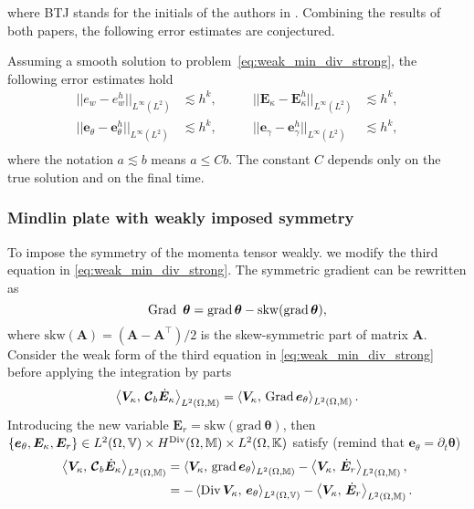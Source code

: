 where BTJ stands for the initials of the authors in \cite{becache2000wave,becache2001elas}. Combining the results of both papers, the following error estimates are conjectured.
\begin{conjecture}\label{conj:BJTestimates}
	Assuming a smooth solution to problem~\eqref{eq:weak_min_div_strong}, the following error estimates hold 
	\begin{equation}
	\label{eq:errBEC}
	\begin{aligned}
	||e_w - e_w^h||_{L^{\infty}(L^2)} &\lesssim h^{k}, \\
	||\bm{e}_\theta - \bm{e}_\theta^h||_{L^{\infty}(L^2)} &\lesssim h^{k}, \\
	\end{aligned} \qquad
	\begin{aligned}
	||\bm{E}_\kappa - \bm{E}_\kappa^h||_{L^{\infty}(L^2)} &\lesssim  h^{k}, \\
	||\bm{e}_\gamma - \bm{e}_\gamma^ h||_{L^{\infty}(L^2)} &\lesssim  h^{k}, \\
	\end{aligned} 
	\end{equation}
	where the notation $a \lesssim  b$ means $a \le C b$. The constant $C$ depends only on the true solution and on the final time.
\end{conjecture}


\subsubsection{Mindlin plate with weakly imposed symmetry}\label{sec:min_weak}
To impose the symmetry of the momenta tensor weakly. we modify the third equation in \eqref{eq:weak_min_div_strong}. The symmetric gradient can be rewritten as 
\[
\Grad\ \bm{\theta} = \grad \bm{\theta} - \mathrm{skw}(\grad \bm{\theta}),
\]
where $\mathrm{skw}(\bm{A})=(\bm{A} - \bm{A}^\top)/2$ is the skew-symmetric part of matrix $\bm{A}$. Consider the weak form of the third equation in \eqref{eq:weak_min_div_strong} before applying the integration by parts
\[
\inner[L^2(\Omega, \mathbb{M})]{\bm{V}_\kappa}{\bm{\mathcal{C}}_b \dot{\bm{E}}_\kappa} = \inner[L^2(\Omega, \mathbb{M})]{\bm{V}_\kappa}{\Grad \bm{e}_\theta}. 
\] Introducing the new variable $\bm{E}_r = \mathrm{skw}(\mathrm{grad}\ \bm{\theta})$, then $\{\bm{e}_\theta, \bm{E}_\kappa, \bm{E}_r\} \in L^2(\Omega, \mathbb{V}) \times H^{\Div}(\Omega, \mathbb{M}) \times L^2(\Omega, \mathbb{K})$ satisfy (remind that $\bm{e}_\theta = \partial_t {\bm{\theta}}$)
\begin{equation*}
\begin{aligned}
\inner[L^2(\Omega, \mathbb{M})]{\bm{V}_\kappa}{\bm{\mathcal{C}}_b \dot{\bm{E}}_\kappa} &= \inner[L^2(\Omega, \mathbb{M})]{\bm{V}_\kappa}{\grad \bm{e}_\theta} - \inner[L^2(\Omega, \mathbb{M})]{\bm{V}_\kappa}{\dot{\bm{E}}_r}, \\
&= -\inner[L^2(\Omega, \mathbb{V})]{\Div\bm{V}_\kappa}{\bm{e}_\theta} - \inner[L^2(\Omega, \mathbb{M})]{\bm{V}_\kappa}{\dot{\bm{E}}_r}.
\end{aligned}
\end{equation*}


